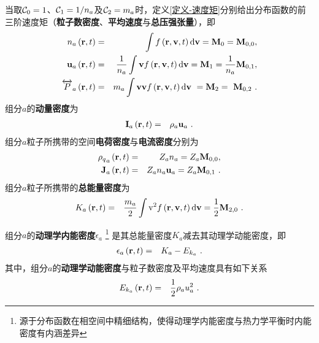   当取$\mathcal{C}_{0}=1$、$\mathcal{C}_{1}=1/n_a$及$\mathcal{C}_{2}=m_a$时，定义\ref{定义-速度矩}分别给出分布函数的前三阶速度矩（\textbf{粒子数密度}、\textbf{平均速度}与\textbf{总压强张量}），即
  \begin{eqnarray}
      n_a \left(\mathbf{r},t \right) &=& \int  f \left(\mathbf{r},\mathbf{v},t \right) \mathrm{d} \mathbf{v}=\mathbf{M}_{0} = \mathbf{M}_{0,0}, \label{na} 
      \\ 
      \mathbf{u}_a \left(\mathbf{r},t \right) &=& \frac{1}{n_a} \int \mathbf{v} f \left(\mathbf{r},\mathbf{v},t \right) \mathrm{d} \mathbf{v} = \mathbf{M}_{1} =  \frac{1}{n_a} \mathbf{M}_{0,1}, \label{ua} 
      \\ 
      \overleftrightarrow{P}_a \left(\mathbf{r},t \right) &=& m_a \int \mathbf{v} \mathbf{v} f \left(\mathbf{r},\mathbf{v},t \right) \mathrm{d} \mathbf{v}  \ = \mathbf{M}_{2} = \  \mathbf{M}_{0,2} ~. \label{PaI}
  \end{eqnarray}
  组分$a$的\textbf{动量密度}为
  \begin{eqnarray}
      \mathbf{I}_a \left(\mathbf{r},t \right) &=& \rho_a \mathbf{u}_a ~. \label{Ia} 
  \end{eqnarray}
  组分$a$粒子所携带的空间\textbf{电荷密度}与\textbf{电流密度}分别为
  \begin{eqnarray}
      {\rho_q}_a \left(\mathbf{r},t \right) &=& Z_a n_a = Z_a  \mathbf{M}_{0,0}, \label{rhoqa} \\ 
      \mathbf{J}_a \left(\mathbf{r},t \right) &=& Z_a n_a \mathbf{u}_a = Z_a \mathbf{M}_{0,1} ~. \label{Ja}
  \end{eqnarray}
  组分$a$粒子所携带的\textbf{总能量密度}为
  \begin{eqnarray}
      K_a \left(\mathbf{r},t \right) &=& \frac{m_a}{2} \int \mathrm{v}^2 f \left(\mathbf{r},\mathbf{v},t \right) \mathrm{d} \mathbf{v} = \frac{1}{2} \mathbf{M}_{2,0}~. \label{Ka}
  \end{eqnarray}
  
  \begin{definition} \label{定义-内能}
    组分$a$的\textbf{动理学内能密度}$\epsilon_a $ \footnote{源于分布函数在相空间中精细结构，使得动理学内能密度与热力学平衡时内能密度有内涵差异} 是其总能量密度$K_a$减去其动理学动能密度，即
    \begin{eqnarray}
      \epsilon_a \left(\mathbf{r},t \right)  &=&  K_a  -  E_{k_a}  ~.  \label{epsilona}
    \end{eqnarray}
    其中，组分$a$的\textbf{动理学动能密度}与粒子数密度及平均速度具有如下关系
    \begin{eqnarray}
      E_{k_a} \left(\mathbf{r},t \right)  &=&  \frac{1}{2} \rho_a u_a^2  ~.  \label{Eka}
    \end{eqnarray}
  \end{definition}

